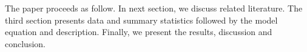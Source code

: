 \documentclass[12pt]{article}%
\begin{document}
The paper proceeds as follow. In next section, we discuss related literature. The third section presents data and summary statistics followed by the model equation and description. Finally, we present the results, discussion and conclusion. 


\newpage
\setlength\bibsep{0pt}


\end{document}
